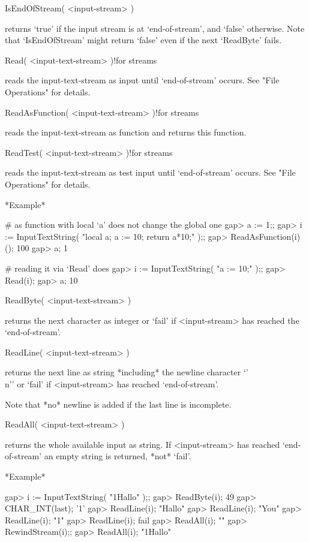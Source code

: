 
\>IsEndOfStream( <input-stream> )

returns `true' if  the input stream  is  at `end-of-stream', and  `false'
otherwise.  Note  that `IsEndOfStream' might return  `false' even  if the
next `ReadByte' fails.

\>Read( <input-text-stream> )!{for streams}

reads the input-text-stream as  input  until `end-of-stream' occurs.  See
"File Operations" for details.

\>ReadAsFunction( <input-text-stream> )!{for streams}

reads the input-text-stream as function and returns this function.

\>ReadTest( <input-text-stream> )!{for streams}

reads the input-text-stream as  test input until `end-of-stream' occurs.
See "File Operations" for details.

*Example*

\beginexample
    # as function with local `a' does not change the global one
    gap> a := 1;;
    gap> i := InputTextString( "local a; a := 10; return a*10;" );;
    gap> ReadAsFunction(i)();
    100
    gap> a;
    1

    # reading it via `Read' does
    gap> i := InputTextString( "a := 10;" );;                      
    gap> Read(i);
    gap> a;
    10
\endexample

\>ReadByte( <input-text-stream> )

returns the  next character as  integer  or `fail'  if <input-stream> has
reached the `end-of-stream'.

\>ReadLine( <input-text-stream> )

returns  the   next line as   string  *including*  the  newline character
`{'\\n'}' or `fail' if <input-stream> has reached `end-of-stream'.

Note that *no* newline is added if the last line is incomplete.

\>ReadAll( <input-text-stream> )

returns   the  whole available input as    string.  If <input-stream> has
reached `end-of-stream' an empty string is returned, *not* `fail'.

*Example*

\beginexample
    gap> i := InputTextString( "1Hallo\nYou{}" );;
    gap> ReadByte(i);
    49
    gap> CHAR_INT(last);
    '1'
    gap> ReadLine(i);
    "Hallo\n"
    gap> ReadLine(i);
    "You\n"
    gap> ReadLine(i);
    "1"
    gap> ReadLine(i);
    fail
    gap> ReadAll(i);
    ""
    gap> RewindStream(i);;
    gap> ReadAll(i);     
    "1Hallo\nYou{}"
\endexample

